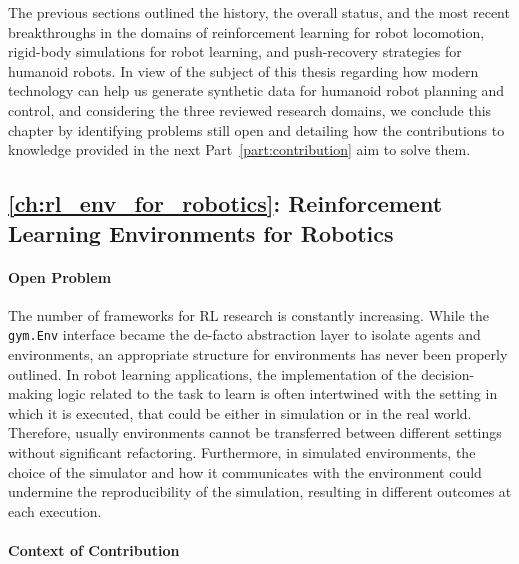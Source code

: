 The previous sections outlined the history, the overall status, and the most recent breakthroughs in the domains of reinforcement learning for robot locomotion, rigid-body simulations for robot learning, and push-recovery strategies for humanoid robots.
In view of the subject of this thesis regarding how modern technology can help us generate synthetic data for humanoid robot planning and control, and considering the three reviewed research domains, we conclude this chapter by identifying problems still open and detailing how the contributions to knowledge provided in the next Part~\ref{part:contribution} aim to solve them.

\subsection{\autoref{ch:rl_env_for_robotics}: Reinforcement Learning Environments for Robotics}

\paragraph{Open Problem}

The number of frameworks for \ac{RL} research is constantly increasing.
While the \verb|gym.Env| interface became the de-facto abstraction layer to isolate agents and environments, an appropriate structure for environments has never been properly outlined.
In robot learning applications, the implementation of the decision-making logic related to the task to learn is often intertwined with the setting in which it is executed, that could be either in simulation or in the real world.
Therefore, usually environments cannot be transferred between different settings without significant refactoring.
Furthermore, in simulated environments, the choice of the simulator and how it communicates with the environment could undermine the reproducibility of the simulation, resulting in different outcomes at each execution.

\paragraph{Context of Contribution}

